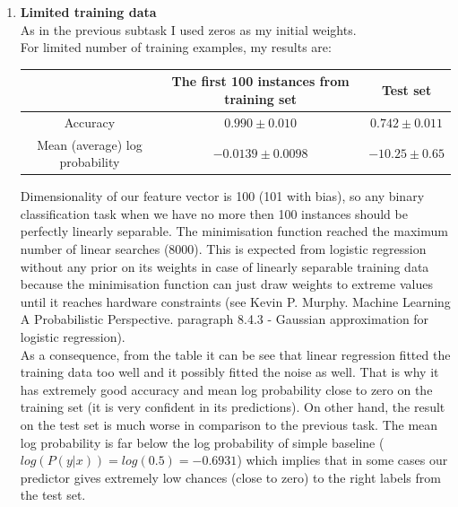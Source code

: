 \documentclass{article}
\begin{document}
\begin{enumerate}[label=(\alph*)]
					\item
						\textbf{Limited training data}\\
						As in the previous subtask I used zeros as my initial weights.\\
						For limited number of training examples, my results are:
						\begin{center}
							\begin{tabular}{| c | c | c |}
								\hline
								\, & The first 100 instances from training set & Test set \\ 
								\hline
								Accuracy & $0.990 \pm 0.010 $ & $0.742 \pm 0.011$ \\ 
								\hline
								Mean (average) log probability & $-0.0139 \pm 0.0098$ & $-10.25 \pm 0.65 $ \\
								\hline
							\end{tabular}
						\end{center}
						Dimensionality of our feature vector is 100 (101 with bias), so any binary classification task when we have no more then 100 instances should be perfectly linearly separable. The minimisation function reached the maximum number of linear searches (8000). This is expected from logistic regression without any prior on its weights in case of linearly separable training data because the minimisation function can just draw weights to extreme values until it reaches hardware constraints (see  Kevin P. Murphy. Machine Learning  A Probabilistic Perspective. paragraph 8.4.3 - Gaussian approximation for logistic regression).
						\\
						As a consequence, from the table it can be see that linear regression fitted the training data too well and it possibly fitted the noise as well.  That is why it has extremely good accuracy and mean log probability close to zero on the training set (it is very confident in its predictions). On other hand, the result on the test set is much worse in comparison to the previous task.  The mean log probability is far below the log probability of simple baseline ($log(P(y | x)) = log(0.5) = -0.6931$) which implies that in some cases our predictor gives extremely low chances (close to zero) to the right labels from the test set.
				\end{enumerate}
\end{document}
